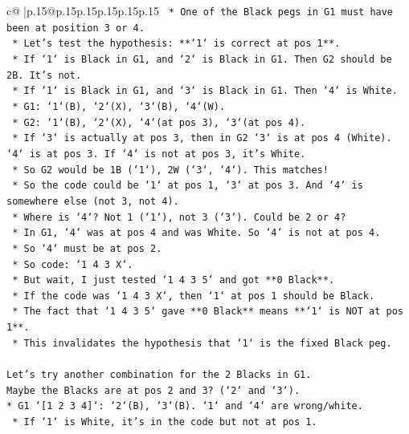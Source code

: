 \documentclass{article}
\begin{document}
{\begin{supertabular}{c@{$\;$}|p{.15\linewidth}@{}p{.15\linewidth}p{.15\linewidth}p{.15\linewidth}p{.15\linewidth}p{.15\linewidth}}
{{{\texttt{    *   One of the Black pegs in G1 must have been at position 3 or 4.} \\
\texttt{    *   Let's test the hypothesis: **`1` is correct at pos 1**.} \\
\texttt{        *   If `1` is Black in G1, and `2` is Black in G1. Then G2 should be 2B. It's not.} \\
\texttt{        *   If `1` is Black in G1, and `3` is Black in G1. Then `4` is White.} \\
\texttt{            *   G1: `1`(B), `2`(X), `3`(B), `4`(W).} \\
\texttt{            *   G2: `1`(B), `2`(X), `4`(at pos 3), `3`(at pos 4).} \\
\texttt{            *   If `3` is actually at pos 3, then in G2 `3` is at pos 4 (White). `4` is at pos 3. If `4` is not at pos 3, it's White.} \\
\texttt{            *   So G2 would be 1B (`1`), 2W (`3`, `4`). This matches!} \\
\texttt{            *   So the code could be `1` at pos 1, `3` at pos 3. And `4` is somewhere else (not 3, not 4).} \\
\texttt{            *   Where is `4`? Not 1 (`1`), not 3 (`3`). Could be 2 or 4?} \\
\texttt{            *   In G1, `4` was at pos 4 and was White. So `4` is not at pos 4.} \\
\texttt{            *   So `4` must be at pos 2.} \\
\texttt{            *   So code: `1 4 3 X`.} \\
\texttt{            *   But wait, I just tested `1 4 3 5` and got **0 Black**.} \\
\texttt{            *   If the code was `1 4 3 X`, then `1` at pos 1 should be Black.} \\
\texttt{            *   The fact that `1 4 3 5` gave **0 Black** means **`1` is NOT at pos 1**.} \\
\texttt{            *   This invalidates the hypothesis that `1` is the fixed Black peg.} \\
\\ 
\texttt{Let's try another combination for the 2 Blacks in G1.} \\
\texttt{Maybe the Blacks are at pos 2 and 3? (`2` and `3`).} \\
\texttt{*   G1 `{[}1 2 3 4{]}`: `2`(B), `3`(B). `1` and `4` are wrong/white.} \\
\texttt{    *   If `1` is White, it's in the code but not at pos 1.} \\
}}}
\end{supertabular}}
\end{document}
